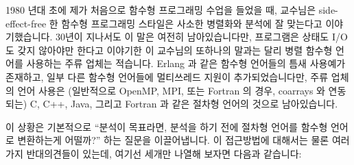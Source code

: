 1980 년대 초에 제가 처음으로 함수형 프로그래밍 수업을 들었을 때, 교수님은
side-effect-free 한 함수형 프로그래밍 스타일은 사소한 병렬화와 분석에 잘
맞는다고 이야기했습니다.
30년이 지나서도 이 말은 여전히 남아있습니다만, 프로그램은 상태도 I/O 도 갖지
않아야만 한다고 이야기한 이 교수님의 또하나의 말과는 달리 병렬 함수형 언어를
사용하는 주류 업체는 적습니다.
Erlang 과 같은 함수형 언어들의 틈새 사용예가 존재하고, 일부 다른 함수형
언어들에 멀티쓰레드 지원이 추가되었습니다만, 주류 업체의 언어 사용은
(일반적으로 OpenMP, MPI, 또는 Fortran 의 경우, coarrays 와 연동되는) C, C++,
Java, 그리고 Fortran 과 같은 절차형 언어의 것으로 남아있습니다.

이 상황은 기본적으로 ``분석이 목표라면, 분석을 하기 전에 절차형 언어를 함수형
언어로 변환하는게 어떨까?'' 하는 질문을 이끌어냅니다.
이 접근방법에 대해서는 물론 여러가지 반대의견들이 있는데, 여기선 세개만 나열해
보자면 다음과 같습니다:
\iffalse

When I took my first-ever functional-programming class in the early 1980s,
the professor asserted that the side-effect-free functional-programming
style was well-suited to trivial parallelization and analysis.
Thirty years later, this assertion remains, but mainstream production
use of parallel functional languages is minimal, a state of affairs
that might well stem from this professor's additional assertion that
programs should neither maintain state nor do I/O.
There is niche use of functional languages such as Erlang, and
multithreaded support has been added to several other functional languages,
but mainstream production usage remains the province of procedural
languages such as C, C++, Java, and Fortran (usually augmented with
OpenMP, MPI, or, in the case of Fortran, coarrays).

This situation naturally leads to the question ``If analysis is the goal,
why not transform the procedural language into a functional language before
doing the analysis?''
There are of course a number of objections to this approach, of which
I list but three:
\fi

